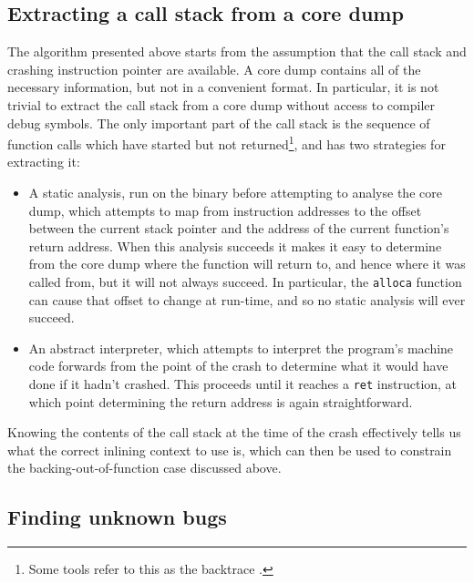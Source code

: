 \subsection{Extracting a call stack from a core dump}


The algorithm presented above starts from the assumption that the call
stack and crashing instruction pointer are available.  A core dump
contains all of the necessary information, but not in a convenient
format.  In particular, it is not trivial to extract the call stack
from a core dump without access to compiler debug symbols.  The only
important part of the call stack is the sequence of function calls
which have started but not returned\footnote{Some tools refer to this
  as the backtrace .}, and {\technique} has two strategies
for extracting it:

\begin{itemize}
\item
  A static analysis, run on the binary before attempting to analyse
  the core dump, which attempts to map from instruction addresses to
  the offset between the current stack pointer and the address of the
  current function's return address.  When this analysis succeeds it
  makes it easy to determine from the core dump where the function
  will return to, and hence where it was called from, but it will not
  always succeed.  In particular, the \verb|alloca| function can cause
  that offset to change at run-time, and so no static analysis will
  ever succeed.
\item
  An abstract interpreter, which attempts to interpret the program's
  machine code forwards from the point of the crash to determine what
  it would have done if it hadn't crashed.  This proceeds until it
  reaches a \verb|ret| instruction, at which point determining the
  return address is again straightforward.
\end{itemize}


Knowing the contents of the call stack at the time of the crash
effectively tells us what the correct inlining context to use is,
which can then be used to constrain the backing-out-of-function case
discussed above.

\subsection{Finding unknown bugs}
\label{sect:derive:unknown_bugs}

